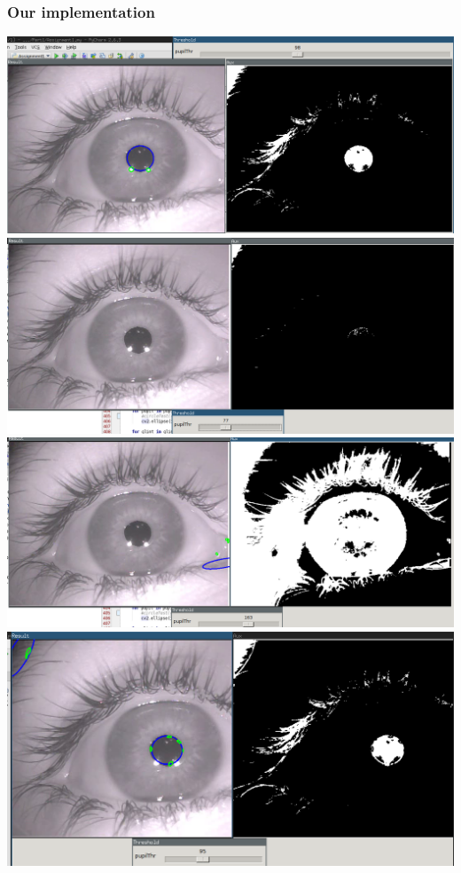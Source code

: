 \subsubsection{Our implementation}

\includegraphics{pics/threshold_good.png}
\includegraphics{pics/threshold_low.png}
\includegraphics{pics/threshold_high.png}
\includegraphics{pics/threshold_contours.png}


